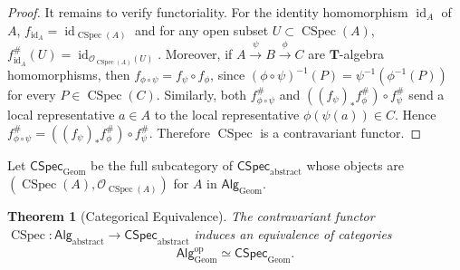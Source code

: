 \documentclass[a4paper,12pt]{amsart}
\theoremstyle{plain}
\newtheorem{theorem}{Theorem}[section]
\theoremstyle{definition}
\begin{document}
\begin{proof}
It remains to verify functoriality.
For the identity homomorphism $\operatorname{id}_A$ of $A$, $f_{\operatorname{id}_A}=\operatorname{id}_{\operatorname{CSpec}(A)}$ and for any open subset $U \subset \operatorname{CSpec}(A)$, $f_{\operatorname{id}_A}^{\#}(U) = \operatorname{id}_{\mathcal{O}_{\operatorname{CSpec}(A)}(U)}$.
Moreover, if $A \xrightarrow{\psi} B \xrightarrow{\phi} C$ are $\boldsymbol{T}$-algebra homomorphisms, then $f_{\phi\circ\psi} = f_{\psi}\circ f_{\phi}$, since $(\phi\circ\psi)^{-1}(P) = \psi^{-1}(\phi^{-1}(P))$ for every $P\in\operatorname{CSpec}(C)$.
Similarly, both $f_{\phi\circ\psi}^{\#}$ and $((f_{\psi})_{\ast} f_{\phi}^{\#}) \circ f_{\psi}^{\#}$ send a local representative $a\in A$ to the local representative $\phi(\psi(a))\in C$.
Hence $f_{\phi\circ\psi}^{\#} = ((f_{\psi})_{\ast} f_{\phi}^{\#}) \circ f_{\psi}^{\#}$.
Therefore $\operatorname{CSpec}$ is a contravariant functor.
\end{proof}

Let $\mathsf{CSpec}_{\mathrm{Geom}}$ be the full subcategory of $\mathsf{CSpec}_{\mathrm{abstract}}$ whose objects are $(\operatorname{CSpec}(A), \mathcal{O}_{\operatorname{CSpec}(A)})$ for $A$ in $\mathsf{Alg}_{\mathrm{Geom}}$.

\begin{theorem}[Categorical Equivalence]
    \label{thm2}
The contravariant functor $\operatorname{CSpec} : \mathsf{Alg}_{\mathrm{abstract}} \to \mathsf{CSpec}_{\mathrm{abstract}}$ induces an equivalence of categories
\begin{align*}
\mathsf{Alg}_{\mathrm{Geom}}^{\mathrm{op}}
\simeq
\mathsf{CSpec}_{\mathrm{Geom}}.
\end{align*}
\end{theorem}
\end{document}
